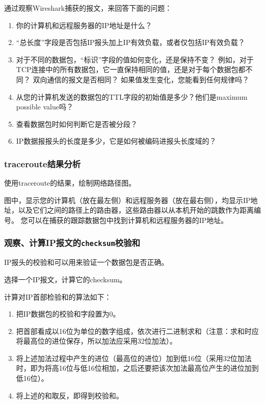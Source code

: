 \documentclass{article}
\begin{document}
通过观察Wireshark捕获的报文，来回答下面的问题： 

\begin{enumerate}[noitemsep]

  \item 你的计算机和远程服务器的IP地址是什么？ 
  \item “总长度”字段是否包括IP报头加上IP有效负载，或者仅包括IP有效负载？
  \item 对于不同的数据包，“标识”字段的值如何变化，还是保持不变？ 例如，对于TCP连接中的所有数据包，它一直保持相同的值，还是对于每个数据包都不同？ 双向通信的报文是否相同？ 如果值发生变化，您能看到任何规律吗？
  \item 从您的计算机发送的数据包的TTL字段的初始值是多少？他们是maximum possible value吗？
  \item 查看数据包时如何判断它是否被分段？
  \item IP数据报报头的长度是多少，它是如何被编码进报头长度域的？

\end{enumerate}

\subsubsection{traceroute结果分析}

使用traceroute的结果，绘制网络路径图。 

图中，显示您的计算机（放在最左侧）和远程服务器（放在最右侧），均显示IP地址，以及它们之间的路径上的路由器，这些路由器以从本机开始的跳数作为距离编号。 您可以在捕获的跟踪数据包中找到计算机和远程服务器的IP地址。

\subsubsection{观察、计算IP报文的\texttt{checksum}校验和}

IP报头的校验和可以用来验证一个数据包是否正确。

选择一个IP报文，计算它的checksum。

计算对IP首部检验和的算法如下：
\begin{enumerate}[noitemsep, label={({\arabic*})}]
  \item 把IP数据包的校验和字段置为0。
  \item 把首部看成以16位为单位的数字组成，依次进行二进制求和（注意：求和时应将最高位的进位保存，所以加法应采用32位加法）。
  \item 将上述加法过程中产生的进位（最高位的进位）加到低16位（采用32位加法时，即为将高16位与低16位相加，之后还要把该次加法最高位产生的进位加到低16位）。
  \item 将上述的和取反，即得到校验和。
\end{enumerate}
\end{document}
